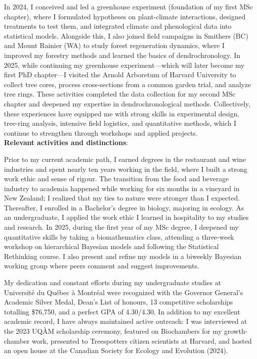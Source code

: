 \documentclass[12pt]{article}
\begin{document}
In 2024, I conceived and led a greenhouse experiment (foundation of my first MSc chapter), where I formulated hypotheses on plant-climate interactions, designed treatments to test them, and integrated climate and phenological data into statistical models. Alongside this, I also joined field campaigns in Smithers (BC) and Mount Rainier (WA) to study forest regeneration dynamics, where I improved my forestry methods and learned the basics of dendrochronology. In 2025, while continuing my greenhouse experiment---which will later become my first PhD chapter---I visited the Arnold Arboretum of Harvard University to collect tree cores, process cross-sections from a common garden trial, and analyze tree rings. These activities completed the data collection for my second MSc chapter and deepened my expertise in dendrochronological methods. Collectively, these experiences have equipped me with strong skills in experimental design, tree-ring analysis, intensive field logistics, and quantitative methods, which I continue to strengthen through workshops and applied projects. \\

\textbf{Relevant activities and distinctions}:  

Prior to my current academic path, I earned degrees in the restaurant and wine industries and spent nearly ten years working in the field, where I built a strong work ethic and sense of rigour. The transition from the food and beverage industry to academia happened while working for six months in a vineyard in New Zealand; I realized that my ties to nature were stronger than I expected. Thereafter, I enrolled in a Bachelor's degree in biology, majoring in ecology. As an undergraduate, I applied the work ethic I learned in hospitality to my studies and research. In 2025, during the first year of my MSc degree, I deepened my quantitative skills by taking a biomathematics class, attending a three-week workshop on hierarchical Bayesian models and following the Statistical Rethinking course. I also present and refine my models in a biweekly Bayesian working group where peers comment and suggest improvements.

My dedication and constant efforts during my undergraduate studies at Université du Québec à Montréal were recognized with the Governor General's Academic Silver Medal, Dean's List of honours, 13 competitive scholarships totalling \$76,750, and a perfect GPA of 4.30/4.30. In addition to my excellent academic record, I have always maintained active outreach: I was interviewed at the 2023 UQÀM scholarship ceremony, featured on Biochambers for my growth-chamber work, presented to Treespotters citizen scientists at Harvard, and hosted an open house at the Canadian Society for Ecology and Evolution (2024).
\end{document}
